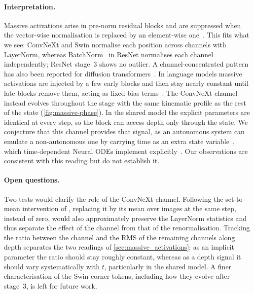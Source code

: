 \paragraph{Interpretation.}
Massive activations arise in pre-norm residual blocks and are suppressed when the
vector-wise normalisation is replaced by an element-wise one~\citep{pmlr-v306-sun26d}.
This fits what we see: ConvNeXt and Swin normalise each position across channels with
LayerNorm, whereas BatchNorm~\citep{ioffe2015batchnorm} in ResNet normalises each
channel independently; ResNet stage~3 shows no outlier.
A channel-concentrated pattern has also been reported for diffusion
transformers~\citep{gan2025ditf}.
In language models massive activations are injected by a few early blocks and then stay
nearly constant until late blocks remove them, acting as fixed bias
terms~\citep{sun2024massiveactivationslargelanguage,pmlr-v306-sun26d}.
The ConvNeXt channel instead evolves throughout the stage with the same kinematic
profile as the rest of the state (\cref{fig:massive-phase}).
In the shared model the explicit parameters are identical at every step, so the block
can access depth only through the state.
We conjecture that this channel provides that signal, as an autonomous system can
emulate a non-autonomous one by carrying time as an extra state
variable~\citep{strogatz2015nonlinear}, which time-dependent Neural ODEs implement
explicitly~\citep{dupont2019augmented}.
Our observations are consistent with this reading but do not establish it.

\paragraph{Open questions.}
Two tests would clarify the role of the ConvNeXt channel.
Following the set-to-mean intervention of \citet{sun2024massiveactivationslargelanguage}, replacing it by its mean over images at the same step, instead of zero, would also approximately preserve the LayerNorm statistics and thus separate the effect of the channel from that of the renormalisation.
Tracking the ratio between the channel and the RMS of the remaining channels along depth separates the two readings of \cref{sec:massive_activations}: as an implicit parameter the ratio should stay roughly constant, whereas as a depth signal it should vary systematically with $t$, particularly in the shared model.
A finer characterisation of the Swin corner tokens, including how they evolve after stage~3, is left for future work.

\FloatBarrier
